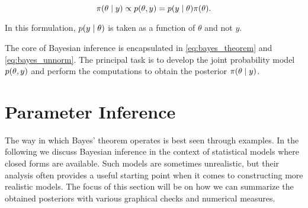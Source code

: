 \begin{equation}\label{eq:bayes_unnorm}
    \pi \qty(\theta \mid y) \propto p(\theta, y) =  p \qty(y \mid \theta) \pi \qty(\theta) .
\end{equation}

In this formulation, $p \qty(y \mid \theta)$ is taken as a function of $\theta$ and not $y$.  

The core of Bayesian inference is encapsulated in \autoref{eq:bayes_theorem} and \autoref{eq:bayes_unnorm}. The principal task is to develop the joint probability model $p(\theta, y)$ and perform the computations to obtain the posterior $\pi \qty(\theta \mid y)$.






\section{Parameter Inference}\label{sec:param_inference}

The way in which Bayes' theorem operates is best seen through examples. In the following we discuss Bayesian inference in the context of statistical models where closed forms are available. Such models are sometimes unrealistic, but their analysis often provides a useful starting point when it comes to constructing more realistic models. The focus of this section will be on how we can summarize the obtained posteriors with various graphical checks and numerical measures. 

